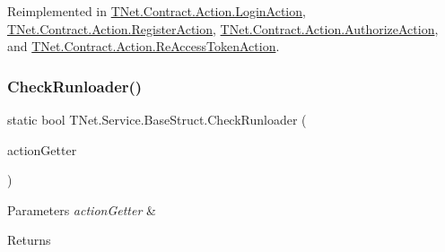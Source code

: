 Reimplemented in \mbox{\hyperlink{class_t_net_1_1_contract_1_1_action_1_1_login_action_ad91710333b360bfc9148f08228161467}{T\+Net.\+Contract.\+Action.\+Login\+Action}}, \mbox{\hyperlink{class_t_net_1_1_contract_1_1_action_1_1_register_action_a5e3d02e2ac91b5d26911619b59e65050}{T\+Net.\+Contract.\+Action.\+Register\+Action}}, \mbox{\hyperlink{class_t_net_1_1_contract_1_1_action_1_1_authorize_action_ab0e2a7e8dacbac0da60cf5415ab5fcaf}{T\+Net.\+Contract.\+Action.\+Authorize\+Action}}, and \mbox{\hyperlink{class_t_net_1_1_contract_1_1_action_1_1_re_access_token_action_a7822fac32c456f1ac8cf613c5982cc30}{T\+Net.\+Contract.\+Action.\+Re\+Access\+Token\+Action}}.

\mbox{\label{class_t_net_1_1_service_1_1_base_struct_adf493fa9ef410d27eec2d82b8beea0e6}} 
\subsubsection{\texorpdfstring{Check\+Runloader()}{CheckRunloader()}}
{\footnotesize\ttfamily static bool T\+Net.\+Service.\+Base\+Struct.\+Check\+Runloader (\begin{DoxyParamCaption}\item[{\mbox{\hyperlink{class_t_net_1_1_service_1_1_action_getter}{Action\+Getter}}}]{action\+Getter }\end{DoxyParamCaption})\hspace{0.3cm}{\ttfamily [static]}}






\begin{DoxyParams}{Parameters}
{\em action\+Getter} & \\
\hline
\end{DoxyParams}
\begin{DoxyReturn}{Returns}

\end{DoxyReturn}
\mbox{\label{class_t_net_1_1_service_1_1_base_struct_adea489f13ef08bb121d64c89f1f868f4}} 
